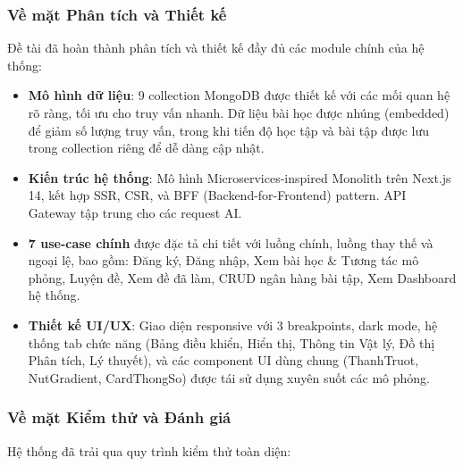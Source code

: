 \subsubsection{Về mặt Phân tích và Thiết kế}

Đề tài đã hoàn thành phân tích và thiết kế đầy đủ các module chính của hệ thống:

\begin{itemize}
    \item \textbf{Mô hình dữ liệu}: 9 collection MongoDB được thiết kế với các mối quan hệ rõ ràng, tối ưu cho truy vấn nhanh. Dữ liệu bài học được nhúng (embedded) để giảm số lượng truy vấn, trong khi tiến độ học tập và bài tập được lưu trong collection riêng để dễ dàng cập nhật.
    
    \item \textbf{Kiến trúc hệ thống}: Mô hình Microservices-inspired Monolith trên Next.js 14, kết hợp SSR, CSR, và BFF (Backend-for-Frontend) pattern. API Gateway tập trung cho các request AI.
    
    \item \textbf{7 use-case chính} được đặc tả chi tiết với luồng chính, luồng thay thế và ngoại lệ, bao gồm: Đăng ký, Đăng nhập, Xem bài học \& Tương tác mô phỏng, Luyện đề, Xem đề đã làm, CRUD ngân hàng bài tập, Xem Dashboard hệ thống.
    
    \item \textbf{Thiết kế UI/UX}: Giao diện responsive với 3 breakpoints, dark mode, hệ thống tab chức năng (Bảng điều khiển, Hiển thị, Thông tin Vật lý, Đồ thị Phân tích, Lý thuyết), và các component UI dùng chung (ThanhTruot, NutGradient, CardThongSo) được tái sử dụng xuyên suốt các mô phỏng.
\end{itemize}

\subsubsection{Về mặt Kiểm thử và Đánh giá}

Hệ thống đã trải qua quy trình kiểm thử toàn diện:

